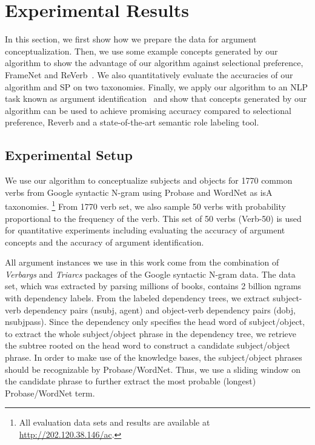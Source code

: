 \section{Experimental Results}
\label{sec:eval}

In this section, we first show how we prepare the data for argument
conceptualization. Then, we use some example concepts
generated by our algorithm to show the advantage of our algorithm
against selectional preference, FrameNet and ReVerb~\cite{FaderSE11}.
We also quantitatively evaluate the accuracies of our algorithm and SP
on two taxonomies. Finally, we apply our algorithm to
an NLP task known as argument
identification~\cite{Gildea2002:NPP,Abend2009:UAI,Meza-Ruiz2009:JIP}
and show that concepts generated by our algorithm can be used
to achieve promising accuracy compared to selectional preference,
Reverb and a state-of-the-art semantic role labeling tool.

\subsection{Experimental Setup}
\label{sec:preprocess}

We use our algorithm to conceptualize subjects and objects
for 1770 common verbs from Google syntactic N-gram using
Probase and WordNet as isA taxonomies.
\footnote{All evaluation data sets and results
are available at \url{http://202.120.38.146/ac}.}
From 1770 verb set, we also
sample 50 verbs with probability proportional to
the frequency of the verb. This set of 50 verbs (Verb-50) is
used for quantitative experiments including evaluating the
accuracy of argument concepts and the accuracy of argument identification.

All argument instances we use in this work come
from the combination of {\em Verbargs} and {\em Triarcs} packages
of the Google syntactic N-gram data.
The data set, which was extracted by parsing millions of books,
contains 2 billion ngrams with dependency labels.
From the labeled dependency trees, we extract
subject-verb dependency pairs (nsubj, agent) and
object-verb dependency pairs (dobj, nsubjpass).
Since the dependency only specifies the head word of subject/object,
to extract the whole subject/object phrase in the dependency tree, we
retrieve the subtree rooted on the head word to construct a candidate
subject/object phrase. In order to make use of the knowledge bases,
the subject/object phrases should be recognizable by Probase/WordNet.
Thus, we use a sliding window on the candidate phrase to further
extract the most probable (longest) Probase/WordNet term.

